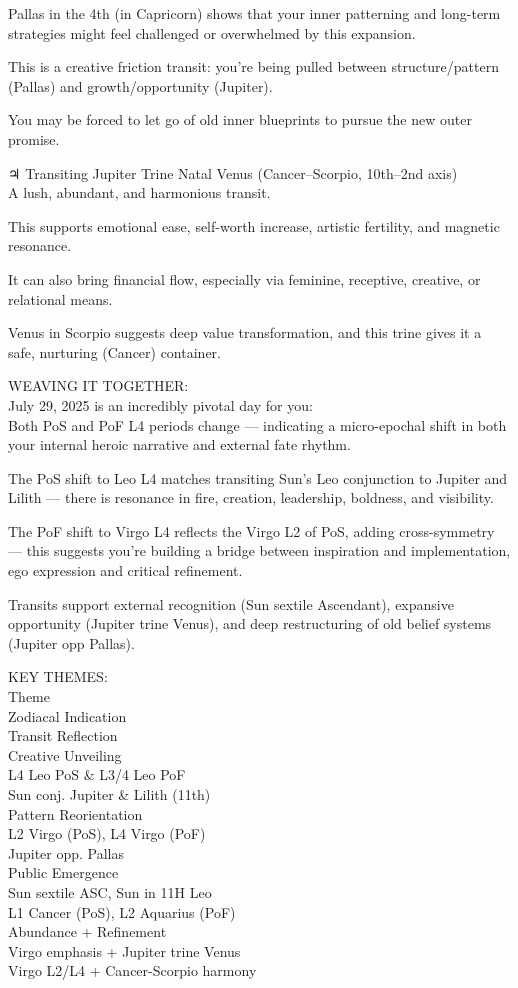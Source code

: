 \documentclass{article}
\begin{document}
Pallas in the 4th (in Capricorn) shows that your inner patterning and long-term strategies might feel challenged or overwhelmed by this expansion.

This is a creative friction transit: you're being pulled between structure/pattern (Pallas) and growth/opportunity (Jupiter).

You may be forced to let go of old inner blueprints to pursue the new outer promise.

♃ Transiting Jupiter Trine Natal Venus (Cancer--Scorpio, 10th--2nd axis)\\
A lush, abundant, and harmonious transit.

This supports emotional ease, self-worth increase, artistic fertility, and magnetic resonance.

It can also bring financial flow, especially via feminine, receptive, creative, or relational means.

Venus in Scorpio suggests deep value transformation, and this trine gives it a safe, nurturing (Cancer) container.

WEAVING IT TOGETHER:\\
July 29, 2025 is an incredibly pivotal day for you:\\
Both PoS and PoF L4 periods change --- indicating a micro-epochal shift in both your internal heroic narrative and external fate rhythm.

The PoS shift to Leo L4 matches transiting Sun's Leo conjunction to Jupiter and Lilith --- there is resonance in fire, creation, leadership, boldness, and visibility.

The PoF shift to Virgo L4 reflects the Virgo L2 of PoS, adding cross-symmetry --- this suggests you're building a bridge between inspiration and implementation, ego expression and critical refinement.

Transits support external recognition (Sun sextile Ascendant), expansive opportunity (Jupiter trine Venus), and deep restructuring of old belief systems (Jupiter opp Pallas).

KEY THEMES:\\
Theme\\
Zodiacal Indication\\
Transit Reflection\\
Creative Unveiling\\
L4 Leo PoS \& L3/4 Leo PoF\\
Sun conj. Jupiter \& Lilith (11th)\\
Pattern Reorientation\\
L2 Virgo (PoS), L4 Virgo (PoF)\\
Jupiter opp. Pallas\\
Public Emergence\\
Sun sextile ASC, Sun in 11H Leo\\
L1 Cancer (PoS), L2 Aquarius (PoF)\\
Abundance + Refinement\\
Virgo emphasis + Jupiter trine Venus\\
Virgo L2/L4 + Cancer-Scorpio harmony
\end{document}
